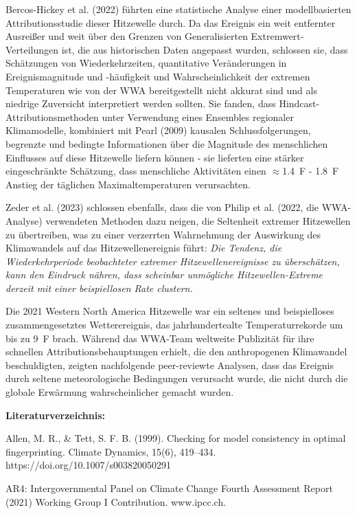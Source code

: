 \documentclass[12pt,paper=a4,DIV=12,parskip=never,chapterprefix=false,headings=standardclasses]{scrreprt}
\begin{document}
Bercos-Hickey et al. (2022) führten eine statistische Analyse einer modellbasierten Attributionsstudie dieser Hitzewelle durch. Da das Ereignis ein weit entfernter Ausreißer und weit über den Grenzen von Generalisierten Extremwert-Verteilungen ist, die aus historischen Daten angepasst wurden, schlossen sie, dass Schätzungen von Wiederkehrzeiten, quantitative Veränderungen in Ereignismagnitude und -häufigkeit und Wahrscheinlichkeit der extremen Temperaturen wie von der WWA bereitgestellt nicht akkurat sind und als niedrige Zuversicht interpretiert werden sollten. Sie fanden, dass Hindcast-Attributionsmethoden unter Verwendung eines Ensembles regionaler Klimamodelle, kombiniert mit Pearl (2009) kausalen Schlussfolgerungen, begrenzte und bedingte Informationen über die Magnitude des menschlichen Einflusses auf diese Hitzewelle liefern können - sie lieferten eine stärker eingeschränkte Schätzung, dass menschliche Aktivitäten einen $\approx$\SI{1.4}{F} - \SI{1.8}{F} Anstieg der täglichen Maximaltemperaturen verursachten.

Zeder et al. (2023) schlossen ebenfalls, dass die von Philip et al. (2022, die WWA-Analyse) verwendeten Methoden dazu neigen, die Seltenheit extremer Hitzewellen zu übertreiben, was zu einer verzerrten Wahrnehmung der Auswirkung des Klimawandels auf das Hitzewellenereignis führt: \emph{Die Tendenz, die Wiederkehrperiode beobachteter extremer Hitzewellenereignisse zu überschätzen, kann den Eindruck nähren, dass scheinbar unmögliche Hitzewellen-Extreme derzeit mit einer beispiellosen Rate clustern.}

Die 2021 Western North America Hitzewelle war ein seltenes und beispielloses zusammengesetztes Wetterereignis, das jahrhundertealte Temperaturrekorde um bis zu \SI{9}{F} brach. Während das WWA-Team weltweite Publizität für ihre schnellen Attributionsbehauptungen erhielt, die den anthropogenen Klimawandel beschuldigten, zeigten nachfolgende peer-reviewte Analysen, dass das Ereignis durch seltene meteorologische Bedingungen verursacht wurde, die nicht durch die globale Erwärmung wahrscheinlicher gemacht wurden.

\vfill
\noindent\textbf{Literaturverzeichnis:}

\begingroup
\parindent=0pt
\everypar{\hangindent=2em\hangafter=1\relax}
Allen, M. R., \& Tett, S. F. B. (1999). Checking for model consistency in optimal fingerprinting. Climate
Dynamics, 15(6), 419–434. https://doi.org/10.1007/s003820050291

AR4: Intergovernmental Panel on Climate Change Fourth Assessment Report (2021) Working Group I
Contribution. www.ipcc.ch.
\end{document}
